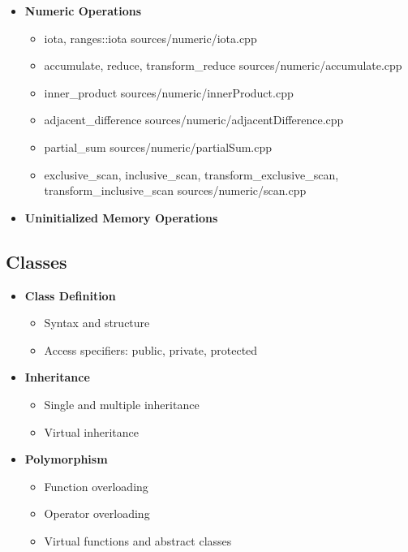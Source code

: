 \documentclass{article}
\begin{document}
\begin{itemize}
        \item \textbf{Numeric Operations}
          \begin{itemize}
            \item iota, ranges::iota
               {sources/numeric/iota.cpp}
            \item accumulate, reduce, transform\_reduce
               {sources/numeric/accumulate.cpp}
            \item inner\_product
               {sources/numeric/innerProduct.cpp}
            \item adjacent\_difference
               {sources/numeric/adjacentDifference.cpp}
            \item partial\_sum
               {sources/numeric/partialSum.cpp}
            \item exclusive\_scan, inclusive\_scan, transform\_exclusive\_scan, transform\_inclusive\_scan
               {sources/numeric/scan.cpp}
          \end{itemize}
        \item \textbf{Uninitialized Memory Operations}
      \end{itemize}
    \subsection{Classes}
      \begin{itemize}
        \item \textbf{Class Definition}
          \begin{itemize}
            \item Syntax and structure
            \item Access specifiers: public, private, protected
          \end{itemize}
        \item \textbf{Inheritance}
          \begin{itemize}
            \item Single and multiple inheritance
            \item Virtual inheritance
          \end{itemize}
        \item \textbf{Polymorphism}
          \begin{itemize}
            \item Function overloading
            \item Operator overloading
            \item Virtual functions and abstract classes
          \end{itemize}
      \end{itemize}
\end{document}
